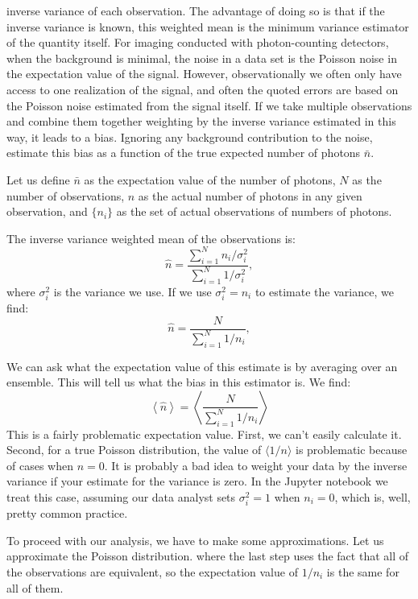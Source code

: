\begin{enumerate}
inverse variance of each observation. The advantage of doing so is
that if the inverse variance is known, this weighted mean is the
minimum variance estimator of the quantity itself. For imaging
conducted with photon-counting detectors, when the background is
minimal, the noise in a data set is the Poisson noise in
the expectation value of the signal. However, observationally we often
only have access to one realization of the signal, and often the
quoted errors are based on the Poisson noise estimated from the signal
itself. If we take multiple observations and combine them together
weighting by the inverse variance estimated in this way, it leads to a
bias. Ignoring any background contribution to the noise, estimate this
bias as a function of the true expected number of photons $\bar n$.

\begin{answer}
Let us define $\bar n$ as the expectation value of the number of
photons, $N$ as the number of observations, $n$ as the actual number
of photons in any given observation, and $\{n_i\}$ as the set of
actual observations of numbers of photons.

The inverse variance weighted mean of the observations is:
\begin{equation}
{\hat n} = \frac{\sum_{i=1}^N n_i / \sigma_i^2}
{\sum_{i=1}^N 1 / \sigma_i^2},
\end{equation}
where $\sigma_i^2$ is the variance we use. If we use $\sigma_i^2 =
n_i$ to estimate the variance, we find:
\begin{equation}
{\hat n} = \frac{N}{\sum_{i=1}^N 1 / n_i},
\end{equation}

We can ask what the expectation value of this estimate is by averaging
over an ensemble. This will tell us what the bias in this estimator
is. We find:
\begin{equation}
\left\langle {\hat n} \right\rangle
= \left\langle \frac{N}{\sum_{i=1}^N 1 / n_i} \right\rangle
\end{equation}
This is a fairly problematic expectation value. First, we can't easily
calculate it. Second, for a true Poisson distribution, the value of
$\langle 1/n\rangle$ is problematic because of cases when $n=0$. It is
probably a bad idea to weight your data by the inverse variance if
your estimate for the variance is zero. In the Jupyter notebook we
treat this case, assuming our data analyst sets $\sigma_i^2 = 1$ when
$n_i=0$, which is, well, pretty common practice.

To proceed with our analysis, we have to make some approximations. Let
us approximate the Poisson distribution.
where the last step uses the fact that all of the observations are
equivalent, so the expectation value of $1/n_i$ is the same for all of
them. 



\end{answer}
\end{enumerate}
